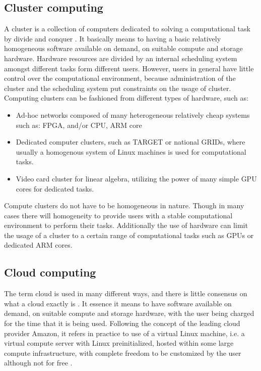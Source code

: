 \subsection{Cluster computing}
\label{subsect:ClusterComputing}
A cluster is a collection of computers dedicated to solving a computational task by divide 
and conquer \cite{Silva:1999, Qiu:2010}. It basically means to having a basic relatively 
homogeneous software available on demand, on suitable compute and storage hardware. Hardware 
resources are divided by an internal scheduling system amongst different tasks form different 
users. However, users in general have little control over the computational environment, 
because administration of the cluster and the scheduling system put constraints on the usage 
of cluster. Computing clusters can be fashioned from different types of hardware, such as:
\begin{itemize}
  \item Ad-hoc networks composed of many heterogeneous relatively cheap systems such as: FPGA, and/or CPU, ARM core
  \item Dedicated computer clusters, such as TARGET or national GRIDs, where usually a homogenous system of Linux machines is used for computational tasks.
  \item Video card cluster for linear algebra, utilizing the power of many simple GPU cores for dedicated tasks.
\end{itemize}
Compute clusters do not have to be homogeneous in nature. Though in many cases there will 
homogeneity to provide users with a stable computational environment to perform their tasks. 
Additionally the use of hardware can limit the usage of a cluster to a certain range of 
computational tasks such as GPUs or dedicated ARM cores.

\subsection{Cloud computing}
\label{sect:CloudComputing}
The term cloud is used in many different ways, and there is little consensus on what a cloud 
exactly is \cite{Foster:2008}. It essence it means to have software available 
on demand, on suitable compute and storage hardware, with the user being charged for the time 
that it is being used. Following the concept of the leading cloud provider Amazon, it refers 
in practice to use of a virtual Linux machine, i.e. a virtual compute server with Linux 
preinitialized, hosted within some large compute infrastructure, with complete freedom to be 
customized by the user although not for free \cite{Trelles:2011}.

